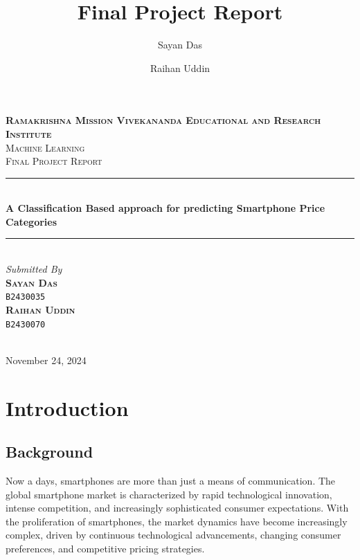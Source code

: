 \documentclass[12pt]{report}
\title{Final Project Report}
\author{
  Sayan Das
  \and
  Raihan Uddin
}
\begin{document}
\begin{titlepage}
	\newcommand{\HRule}{\rule{\linewidth}{0.5mm}}
	\center


	\textsc{\LARGE \textbf{Ramakrishna Mission Vivekananda Educational and Research Institute}}\\[1.5cm]

	\textsc{\LARGE Machine Learning}\\[0.5cm]

	\textsc{\large Final Project Report}\\[0.5cm]

	\HRule\\[0.4cm]

	{\huge\bfseries A Classification Based approach for predicting Smartphone Price Categories}\\[0.4cm]

	\HRule\\[1.5cm]



\large
\textit{Submitted By}\\
\textsc{\textbf{Sayan Das }}\\
\vspace{-0.5em}
\textsc{\texttt{B2430035 }}\\
\textsc{\textbf{Raihan Uddin }}\\
\vspace{-0.5em}
\textsc{\texttt{B2430070} }\\

	~
	\begin{minipage}{0.4\textwidth}
	\end{minipage}


	\vfill\vfill\vfill

	{\large November 24, 2024}

	\vfill

\end{titlepage}
\restoregeometry

\tableofcontents

\chapter{Introduction}
\section{Background}
Now a days, smartphones are more than just a means of communication. The global smartphone market is characterized by rapid technological innovation, intense competition, and increasingly sophisticated consumer expectations. With the proliferation of smartphones, the market dynamics have become increasingly complex, driven by continuous technological advancements, changing consumer preferences, and competitive pricing strategies.
\end{document}
